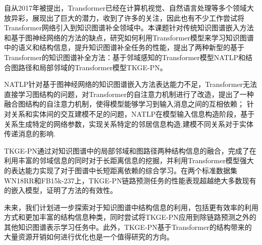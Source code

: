 \summary
自从2017年被提出，Transformer已经在计算机视觉、自然语言处理等多个领域大放异彩，展现出了巨大的潜力，收到了许多的关注，因此也有不少工作尝试将Transformer网络引入到知识图谱补全领域中。本课题针对传统知识图谱嵌入方法和基于图神经网络的方法的缺点，研究如何利用Transformer模型来学习知识图谱中的语义和结构信息，提升知识图谱补全任务的性能，提出了两种新型的基于Transformer的知识图谱补全方法：基于邻域感知的Transformer模型NATLP和结合图路径和局部邻域的Transformer模型TKGE-PN。

NATLP针对基于图神经网络的知识图谱嵌入方法表达能力不足，Transformer无法直接学习图结构的问题，对Transformer的自注意力机制进行了改造，提出了一种融合图结构的自注意力机制，使得模型能够学习到输入消息之间的互相依赖；
针对关系和实体间的交互建模不足的问题，NATLP在模型输入信息构造阶段，基于关系生成特定的网络参数，实现关系特定的邻居信息构造,建模不同关系对于实体传递消息的影响.

TKGE-PN通过对知识图谱中的局部邻域和图路径两种结构信息的融合，完成了在利用丰富的邻域信息的同时对于长距离信息的挖掘，并利用Transformer模型强大的表达能力实现了对于图谱中长短距离依赖的综合学习。在两个标准数据集WN18RR和FB15k-237上，TKGE-PN链路预测任务的性能表现超越绝大多数现有的嵌入模型，证明了方法的有效性。

未来，我们计划进一步探索对于知识图谱中结构信息的利用，包括更有效率的利用方式和更加丰富的结构信息种类，同时尝试将TKGE-PN应用到除链路预测之外的其他知识图谱表示学习任务中。此外，TKGE-PN基于Transformer的结构带来的大量资源开销如何进行优化也是一个值得研究的方向。

